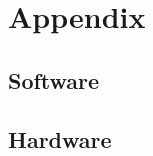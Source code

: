 \documentclass[a4paper,11pt,oneside]{report}
\newcommand{\setlinespacing}[1]
           {\renewcommand{\baselinestretch}{#1}\small\normalsize}
\theoremstyle{plain}
\theoremstyle{definition}
\begin{document}

\appendix
\chapter{Appendix}

\section{Software}


\section{Hardware}


\clearpage
\setlinespacing{1}


\end{document}
